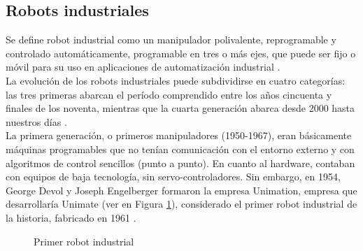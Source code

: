 \subsection{Robots industriales}
\label{sec:robots_industriales}

Se define robot industrial como un manipulador polivalente, reprogramable y controlado automáticamente, programable en tres o más ejes, que puede ser fijo o móvil para su uso en aplicaciones de automatización industrial \cite{ISO8373}.\\

La evolución de los robots industriales puede subdividirse en cuatro categorías: las tres primeras abarcan el período comprendido entre los años cincuenta y finales de los noventa, mientras que la cuarta generación abarca desde 2000 hasta nuestros días \cite{Gasparetto19}.\\

La primera generación, o primeros manipuladores (1950-1967), eran básicamente máquinas programables que no tenían comunicación con el entorno externo y con algoritmos de control sencillos (punto a punto). En cuanto al hardware, contaban con equipos de baja tecnología, sin servo-controladores. Sin embargo, en 1954, George Devol y Joseph Engelberger formaron la empresa Unimation, empresa que desarrollaría Unimate (ver en Figura \ref{fig:primer_robot_industrial}), considerado el primer robot industrial de la historia, fabricado en 1961 \cite{Zamalloa17}.
  
  \begin{figure}[H]
    \begin{center}
      \subcapcentertrue
      \hspace{2mm}
    \end{center}
    \caption{Primer robot industrial}
    \label{fig:primer_robot_industrial}
  \end{figure}
  
